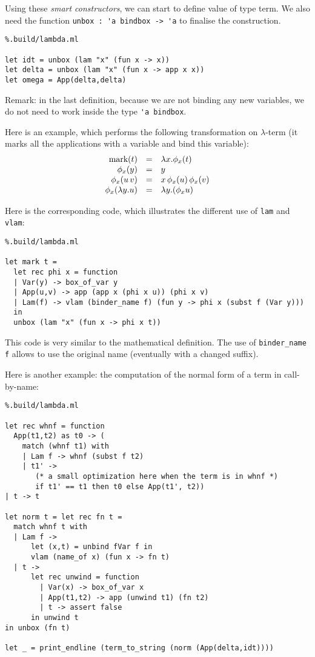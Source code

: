 \documentclass[11pt]{article}
\begin{document}
Using these \emph{smart constructors}, we can start to define value of
type term. We also need the function \verb#unbox : 'a bindbox -> 'a#
to finalise the construction.
\begin{lstlisting}%.build/lambda.ml

let idt = unbox (lam "x" (fun x -> x))
let delta = unbox (lam "x" (fun x -> app x x))
let omega = App(delta,delta)
\end{lstlisting}

Remark: in the last definition, because we are not binding any new
variables, we do not need to work inside the type \verb#'a bindbox#.

Here is an example, which performs the following transformation on
$\lambda$-term (it marks all the applications with a variable and bind this variable):
$$
\begin{array}{rcl}
\hbox{mark}(t) &=& \lambda x.\phi_x(t) \cr
\phi_x(y) &=& y \cr
\phi_x(u\,v) &=& x\,\phi_x(u)\,\phi_x(v) \cr
\phi_x(\lambda y.u) &=& \lambda y.(\phi_x u)
\end{array}
$$

Here is the corresponding code, which illustrates the different use
of \verb#lam# and \verb#vlam#:

\begin{lstlisting}%.build/lambda.ml

let mark t =
  let rec phi x = function
  | Var(y) -> box_of_var y
  | App(u,v) -> app (app x (phi x u)) (phi x v)
  | Lam(f) -> vlam (binder_name f) (fun y -> phi x (subst f (Var y)))
  in
  unbox (lam "x" (fun x -> phi x t))
\end{lstlisting}

This code is very similar to the mathematical definition.
The use of \verb#binder_name f# allows to use the original name
(eventually with a changed suffix).

Here is another example: the computation of the normal form of a term
in call-by-name:

\begin{lstlisting}%.build/lambda.ml

let rec whnf = function
  App(t1,t2) as t0 -> (
    match (whnf t1) with
    | Lam f -> whnf (subst f t2)
    | t1' ->
       (* a small optimization here when the term is in whnf *)
       if t1' == t1 then t0 else App(t1', t2))
| t -> t

let norm t = let rec fn t =
  match whnf t with
  | Lam f ->
      let (x,t) = unbind fVar f in
      vlam (name_of x) (fun x -> fn t)
  | t ->
      let rec unwind = function
        | Var(x) -> box_of_var x
        | App(t1,t2) -> app (unwind t1) (fn t2)
        | t -> assert false
      in unwind t
in unbox (fn t)

let _ = print_endline (term_to_string (norm (App(delta,idt))))
\end{lstlisting}
\end{document}
